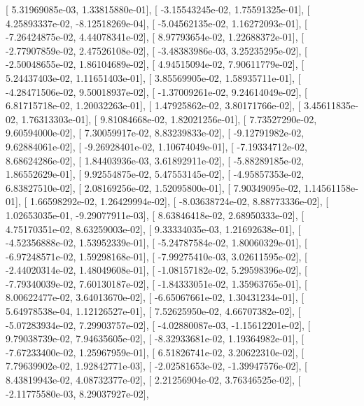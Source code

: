\documentclass{article}
\begin{document}
       [  5.31969085e-03,   1.33815880e-01],
       [ -3.15543245e-02,   1.75591325e-01],
       [  4.25893337e-02,  -8.12518269e-04],
       [ -5.04562135e-02,   1.16272093e-01],
       [ -7.26424875e-02,   4.44078341e-02],
       [  8.97793654e-02,   1.22688372e-01],
       [ -2.77907859e-02,   2.47526108e-02],
       [ -3.48383986e-03,   3.25235295e-02],
       [ -2.50048655e-02,   1.86104689e-02],
       [  4.94515094e-02,   7.90611779e-02],
       [  5.24437403e-02,   1.11651403e-01],
       [  3.85569905e-02,   1.58935711e-01],
       [ -4.28471506e-02,   9.50018937e-02],
       [ -1.37009261e-02,   9.24614049e-02],
       [  6.81715718e-02,   1.20032263e-01],
       [  1.47925862e-02,   3.80171766e-02],
       [  3.45611835e-02,   1.76313303e-01],
       [  9.81084668e-02,   1.82021256e-01],
       [  7.73527290e-02,   9.60594000e-02],
       [  7.30059917e-02,   8.83239833e-02],
       [ -9.12791982e-02,   9.62884061e-02],
       [ -9.26928401e-02,   1.10674049e-01],
       [ -7.19334712e-02,   8.68624286e-02],
       [  1.84403936e-03,   3.61892911e-02],
       [ -5.88289185e-02,   1.86552629e-01],
       [  9.92554875e-02,   5.47553145e-02],
       [ -4.95857353e-02,   6.83827510e-02],
       [  2.08169256e-02,   1.52095800e-01],
       [  7.90349095e-02,   1.14561158e-01],
       [  1.66598292e-02,   1.26429994e-02],
       [ -8.03638724e-02,   8.88773336e-02],
       [  1.02653035e-01,  -9.29077911e-03],
       [  8.63846418e-02,   2.68950333e-02],
       [  4.75170351e-02,   8.63259003e-02],
       [  9.33334035e-03,   1.21692638e-01],
       [ -4.52356888e-02,   1.53952339e-01],
       [ -5.24787584e-02,   1.80060329e-01],
       [ -6.97248571e-02,   1.59298168e-01],
       [ -7.99275410e-03,   3.02611595e-02],
       [ -2.44020314e-02,   1.48049608e-01],
       [ -1.08157182e-02,   5.29598396e-02],
       [ -7.79340039e-02,   7.60130187e-02],
       [ -1.84333051e-02,   1.35963765e-01],
       [  8.00622477e-02,   3.64013670e-02],
       [ -6.65067661e-02,   1.30431234e-01],
       [  5.64978538e-04,   1.12126527e-01],
       [  7.52625950e-02,   4.66707382e-02],
       [ -5.07283934e-02,   7.29903757e-02],
       [ -4.02880087e-03,  -1.15612201e-02],
       [  9.79038739e-02,   7.94635605e-02],
       [ -8.32933681e-02,   1.19364982e-01],
       [ -7.67233400e-02,   1.25967959e-01],
       [  6.51826741e-02,   3.20622310e-02],
       [  7.79639902e-02,   1.92842771e-03],
       [ -2.02581653e-02,  -1.39947576e-02],
       [  8.43819943e-02,   4.08732377e-02],
       [  2.21256904e-02,   3.76346525e-02],
       [ -2.11775580e-03,   8.29037927e-02],
\end{document}
